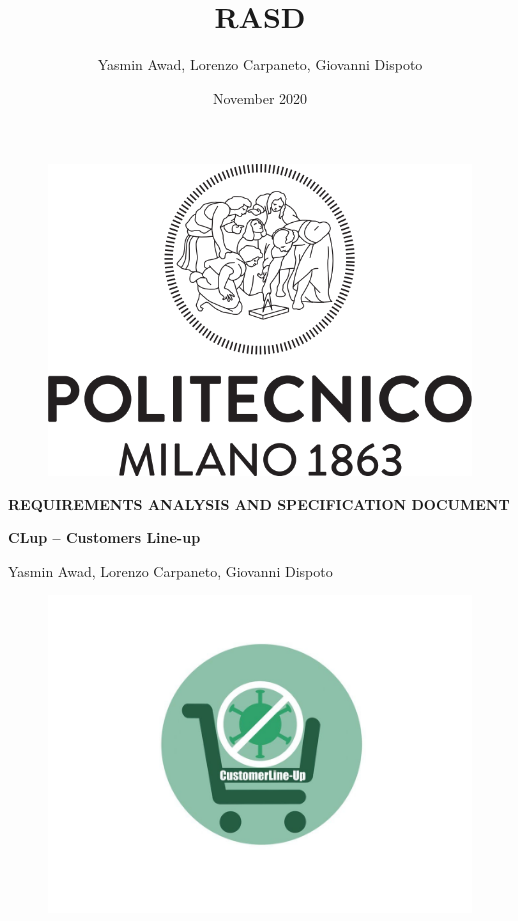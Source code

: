 \documentclass[a4paper, 12pt, oneside]{article}
\title{RASD}
\author{Yasmin Awad, Lorenzo Carpaneto, Giovanni Dispoto}
\date{November 2020}
\begin{document}
\begin{titlepage}
\begin{figure}[h!]
	\centering
	\includegraphics[scale=0.5]{img/logopoli.png}
\end{figure}
\vspace{0.7em}
\begin{center}
	\Large \textbf{REQUIREMENTS ANALYSIS AND SPECIFICATION DOCUMENT}
\end{center}
\begin{center}
	\Large \textbf{CLup – Customers Line-up } 
\end{center}
\vspace{-0.6em}
\begin{center}
	\normalsize Yasmin Awad, Lorenzo Carpaneto, Giovanni Dispoto
	\begin{figure}[h!]
	\centering
	\includegraphics[scale=0.25]{img/GUI/logo.jpg}
\end{figure}
\end{center}
\vspace*{\fill}
\end{titlepage}
\end{document}
